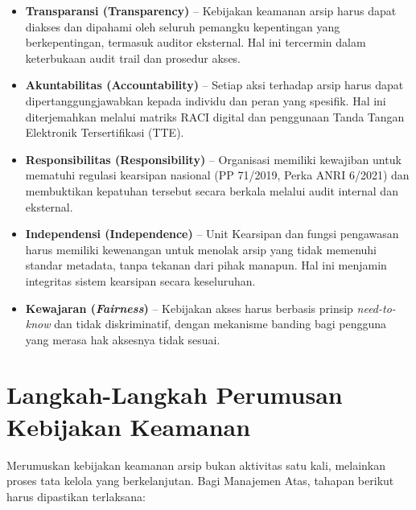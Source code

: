 \documentclass[12pt,a4paper]{report}
\begin{document}
\begin{itemize}[leftmargin=*]
    \item \textbf{Transparansi (Transparency)} -- Kebijakan keamanan arsip harus dapat diakses dan dipahami oleh seluruh pemangku kepentingan yang berkepentingan, termasuk auditor eksternal. Hal ini tercermin dalam keterbukaan audit trail dan prosedur akses.
    \item \textbf{Akuntabilitas (Accountability)} -- Setiap aksi terhadap arsip harus dapat dipertanggungjawabkan kepada individu dan peran yang spesifik. Hal ini diterjemahkan melalui matriks RACI digital dan penggunaan Tanda Tangan Elektronik Tersertifikasi (TTE).
    \item \textbf{Responsibilitas (Responsibility)} -- Organisasi memiliki kewajiban untuk mematuhi regulasi kearsipan nasional (PP 71/2019, Perka ANRI 6/2021) dan membuktikan kepatuhan tersebut secara berkala melalui audit internal dan eksternal.
    \item \textbf{Independensi (Independence)} -- Unit Kearsipan dan fungsi pengawasan harus memiliki kewenangan untuk menolak arsip yang tidak memenuhi standar metadata, tanpa tekanan dari pihak manapun. Hal ini menjamin integritas sistem kearsipan secara keseluruhan.
    \item \textbf{Kewajaran (\textit{Fairness})} -- Kebijakan akses harus berbasis prinsip \textit{need-to-know} dan tidak diskriminatif, dengan mekanisme banding bagi pengguna yang merasa hak aksesnya tidak sesuai.
\end{itemize}

\section{Langkah-Langkah Perumusan Kebijakan Keamanan}
Merumuskan kebijakan keamanan arsip bukan aktivitas satu kali, melainkan proses tata kelola yang berkelanjutan. Bagi Manajemen Atas, tahapan berikut harus dipastikan terlaksana:
\end{document}

